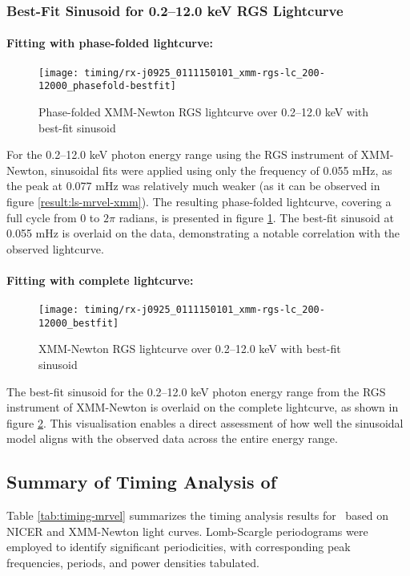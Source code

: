			\newpage
			\subsubsection{Best-Fit Sinusoid for 0.2--12.0 keV RGS Lightcurve}
				\paragraph{Fitting with phase-folded lightcurve:}
				\begin{figure}[h!]
					\centering
					\texttt{[image: timing/rx-j0925\_0111150101\_xmm-rgs-lc\_200-12000\_phasefold-bestfit]}
					\caption{Phase-folded XMM-Newton RGS lightcurve over 0.2--12.0 keV with best-fit sinusoid}
					\label{result:lc-phase-fold-mrvel-xmm-rgs:200-12000-bestfit}
				\end{figure}
				For the 0.2--12.0 keV photon energy range using the RGS instrument of XMM-Newton, sinusoidal fits were applied using only the frequency of 0.055 mHz, as the peak at 0.077 mHz was relatively much weaker (as it can be observed in figure \ref{result:ls-mrvel-xmm}). The resulting phase-folded lightcurve, covering a full cycle from 0 to $2\pi$ radians, is presented in figure \ref{result:lc-phase-fold-mrvel-xmm-rgs:200-12000-bestfit}. The best-fit sinusoid at 0.055 mHz is overlaid on the data, demonstrating a notable correlation with the observed lightcurve.
				
				\paragraph{Fitting with complete lightcurve:}
				\begin{figure}[h!]
					\centering
					\texttt{[image: timing/rx-j0925\_0111150101\_xmm-rgs-lc\_200-12000\_bestfit]}
					\caption{XMM-Newton RGS lightcurve over 0.2--12.0 keV with best-fit sinusoid}
					\label{result:lc-mrvel-xmm-rgs:200-12000-bestfit}
				\end{figure}
				The best-fit sinusoid for the 0.2--12.0 keV photon energy range from the RGS instrument of XMM-Newton is overlaid on the complete lightcurve, as shown in figure \ref{result:lc-mrvel-xmm-rgs:200-12000-bestfit}. This visualisation enables a direct assessment of how well the sinusoidal model aligns with the observed data across the entire energy range.

		\subsection{Summary of Timing Analysis of \source}
		Table \ref{tab:timing-mrvel} summarizes the timing analysis results for \source\ based on NICER and XMM-Newton light curves. Lomb-Scargle periodograms were employed to identify significant periodicities, with corresponding peak frequencies, periods, and power densities tabulated.
		
